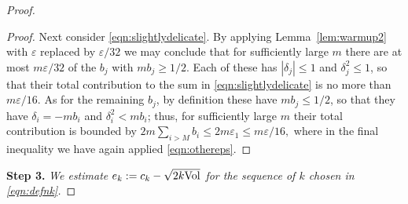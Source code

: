 \documentclass[11pt, reqno]{amsart}
\theoremstyle{remark}
\numberwithin{equation}{subsection}
\numberwithin{figure}{section}
\theoremstyle{customremark}
\newcommand{\Vol}{{\rm Vol}}
\newcommand{\NI}{{\noindent}}
\newcommand{\de}{{\delta}}
\newcommand{\eps}{\varepsilon}
\begin{document}
\begin{proof}
\begin{proof}
Next consider \eqref{eqn:slightlydelicate}.  By applying Lemma~\ref{lem:warmup2} with $\eps$ replaced by $\eps/32$  we may conclude that
for sufficiently large $m$ there are at most $m \eps/32$ of the $b_j$ with $m b_j \ge 1/2$.  Each of these has $|\delta_j| \le 1$ and $\delta_j^2 \le 1$, so that their total contribution to the sum in \eqref{eqn:slightlydelicate} is no more than $m \eps/16$.  As for the remaining $b_j$, by definition these have $mb_j \le 1/2$, so that they have $\delta_i = - mb_i$ and $\de_i^2< mb_i$; thus, for sufficiently large $m$ their total contribution is bounded by $2 m \sum_{i > M} b_i \le 2 m \eps_1 \le m\eps/16,$ where in the final inequality we have again applied \eqref{eqn:othereps}.
\end{proof}

\NI {\bf Step 3.} {\it We estimate $e_k:=c_k - \sqrt{2k \Vol}$ for the sequence of  $k$ chosen in \eqref{eqn:defnk}.}


\end{proof}
\end{document}
